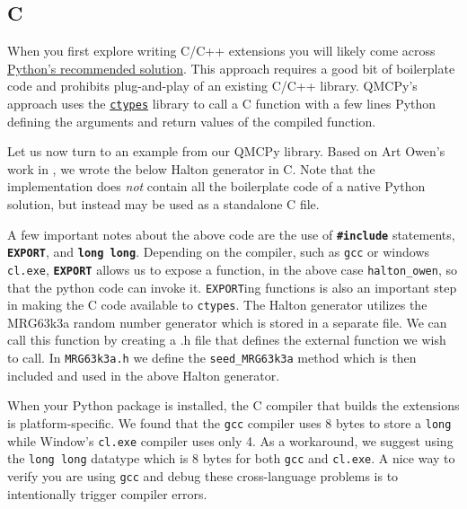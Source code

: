 \subsection{C}

When you first explore writing C/C++ extensions you will likely come across \href{https://docs.python.org/3/extending/extending.html}{Python's recommended solution}. This approach requires a good bit of boilerplate code and prohibits plug-and-play of an existing C/C++ library. QMCPy's approach uses the \href{https://docs.python.org/3/library/ctypes.html}{\texttt{ctypes}} library to call a C function with a few lines Python defining the arguments and return values of the compiled function. 

Let us now turn to an example from our QMCPy \cite{QMCPy2020a} library. Based on Art Owen's work in \cite{owen2017randomized}, we wrote the below Halton generator in C. Note that the implementation does \emph{not} contain all the boilerplate code of a native Python solution, but instead may be used as a standalone C file.



A few important notes about the above code are the use of \textbf{\texttt{\#include}} statements, \textbf{\texttt{EXPORT}}, and \textbf{\texttt{long long}}. Depending on the compiler, such as \texttt{gcc} or windows \texttt{cl.exe}, \textbf{\texttt{EXPORT}} allows us to expose a function, in the above case \texttt{halton\_owen}, so that the python code can invoke it. \texttt{EXPORT}ing functions is also an important step in making the C code available to \texttt{ctypes}. The Halton generator utilizes the MRG63k3a random number generator \cite{mrg63k3a} which is stored in a separate file. We can call this function by creating a .h file that defines the external function we wish to call. In \texttt{MRG63k3a.h} we define the \texttt{seed\_MRG63k3a} method which is then included and used in the above Halton generator. 

When your Python package is installed, the C compiler that builds the extensions is platform-specific. We found that the \texttt{gcc} compiler uses 8 bytes to store a \texttt{long} while Window's \texttt{cl.exe} compiler uses only 4. As a workaround, we suggest using the \texttt{long long} datatype which is 8 bytes for both \texttt{gcc} and \texttt{cl.exe}. A nice way to verify you are using \texttt{gcc} and debug these cross-language problems is to intentionally trigger compiler errors.


